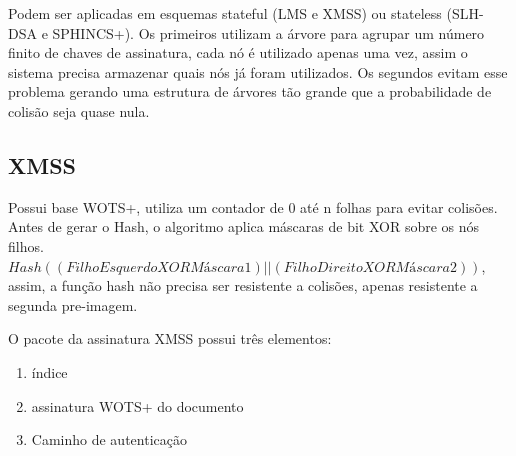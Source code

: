 Podem ser aplicadas em esquemas stateful (LMS e XMSS) ou stateless (SLH-DSA e SPHINCS+). Os primeiros utilizam a árvore para agrupar um número finito de chaves de assinatura, cada nó é utilizado apenas uma vez, assim o sistema precisa armazenar quais nós já foram utilizados. Os segundos evitam esse problema gerando uma estrutura de árvores tão grande que a probabilidade de colisão seja quase nula.

\subsection{XMSS}

Possui base WOTS+, utiliza um contador de 0 até n folhas para evitar colisões. Antes de gerar o Hash, o algoritmo aplica máscaras de bit XOR sobre os nós filhos. $Hash((FilhoEsquerdo XOR Máscara1) || (FilhoDireito XOR Máscara2))$, assim, a função hash não precisa ser resistente a colisões, apenas resistente a segunda pre-imagem.

O pacote da assinatura XMSS possui três elementos:
\begin{enumerate}
	\item índice
	\item assinatura WOTS+ do documento
	\item Caminho de autenticação
\end{enumerate}

